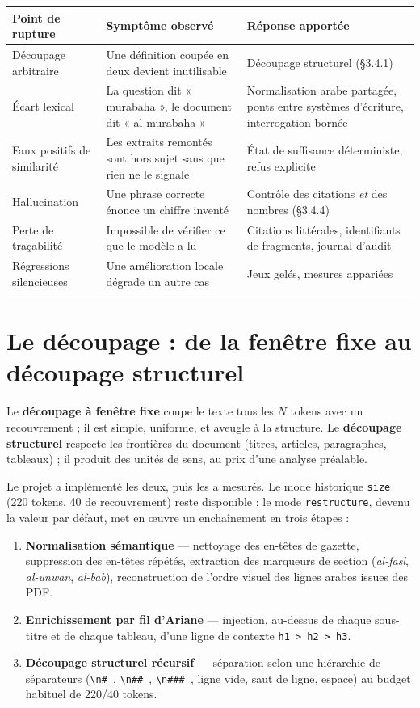\documentclass[a4paper,12pt]{report}
\begin{document}
\begin{table}[H]
\centering
\small
\begin{tabular}{p{3.5cm}p{5.0cm}p{5.7cm}}
\toprule
\textbf{Point de rupture} & \textbf{Symptôme observé} & \textbf{Réponse apportée} \\
\midrule
Découpage arbitraire & Une définition coupée en deux devient inutilisable & Découpage structurel
(§3.4.1) \\
Écart lexical & La question dit « murabaha », le document dit « al-murabaha » & Normalisation arabe
partagée, ponts entre systèmes d'écriture, interrogation bornée \\
Faux positifs de similarité & Les extraits remontés sont hors sujet sans que rien ne le signale &
État de suffisance déterministe, refus explicite \\
Hallucination & Une phrase correcte énonce un chiffre inventé & Contrôle des citations \emph{et}
des nombres (§3.4.4) \\
Perte de traçabilité & Impossible de vérifier ce que le modèle a lu & Citations littérales,
identifiants de fragments, journal d'audit \\
Régressions silencieuses & Une amélioration locale dégrade un autre cas & Jeux gelés, mesures
appariées \\
\bottomrule
\end{tabular}
\end{table}

\section{Le découpage : de la fenêtre fixe au découpage structurel}
Le \textbf{découpage à fenêtre fixe} coupe le texte tous les $N$ tokens avec un recouvrement ; il
est simple, uniforme, et aveugle à la structure. Le \textbf{découpage structurel} respecte les
frontières du document (titres, articles, paragraphes, tableaux) ; il produit des unités de sens,
au prix d'une analyse préalable.

Le projet a implémenté les deux, puis les a mesurés. Le mode historique \texttt{size}
(220 tokens, 40 de recouvrement) reste disponible ; le mode \texttt{restructure}, devenu la
valeur par défaut, met en œuvre un enchaînement en trois étapes :

\begin{enumerate}
  \item \textbf{Normalisation sémantique} — nettoyage des en-têtes de gazette, suppression des
        en-têtes répétés, extraction des marqueurs de section (\emph{al-fasl}, \emph{al-unwan},
        \emph{al-bab}), reconstruction de l'ordre visuel des lignes arabes issues des PDF.
  \item \textbf{Enrichissement par fil d'Ariane} — injection, au-dessus de chaque sous-titre et de
        chaque tableau, d'une ligne de contexte \texttt{h1 > h2 > h3}.
  \item \textbf{Découpage structurel récursif} — séparation selon une hiérarchie de séparateurs
        (\texttt{\textbackslash n\# }, \texttt{\textbackslash n\#\# },
        \texttt{\textbackslash n\#\#\# }, ligne vide, saut de ligne, espace) au budget habituel
        de 220/40 tokens.
\end{enumerate}
\end{document}
